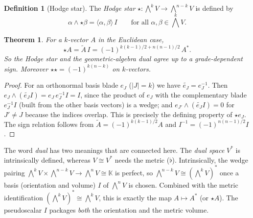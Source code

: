 \documentclass[11pt,a4paper]{article}
\newcounter{thm}[section]
\numberwithin{equation}{section}
\theoremstyle{definition}
\newtheorem{definition}[thm]{Definition}
\theoremstyle{plain}
\newtheorem{theorem}[thm]{Theorem}
\newcommand{\K}{\mathbb{K}}
\newcommand{\rev}[1]{\widetilde{#1}}
\newcommand{\pss}{I}
\newcommand{\dual}[1]{#1^{\ast}}
\newcommand{\hodge}{\star}
\begin{document}
\begin{definition}[Hodge star]
The \emph{Hodge star} $\hodge:\bigwedge^kV\to\bigwedge^{n-k}V$ is defined by
\[
 \alpha\wedge\hodge\beta=\langle\alpha,\beta\rangle\,\pss\qquad\text{for all }\alpha,\beta\in\textstyle\bigwedge^kV .
\]
\end{definition}

\begin{theorem}\label{thm:hodgeGA}
For a $k$-vector $A$ in the Euclidean case,
\[
 \hodge A=\rev A\,\pss=(-1)^{k(k-1)/2+n(n-1)/2}\,\dual A .
\]
So the Hodge star and the geometric-algebra dual agree up to a grade-dependent sign. Moreover $\hodge\hodge=(-1)^{k(n-k)}$ on $k$-vectors.
\end{theorem}
\begin{proof}
For an orthonormal basis blade $e_J$ ($|J|=k$) we have $\rev{e_J}=e_J^{-1}$. Then $e_J\wedge(\rev{e_J}\pss)=e_J\,e_J^{-1}\pss=\pss$, since the product of $e_J$ with the complementary blade $e_J^{-1}\pss$ (built from the other basis vectors) is a wedge; and $e_{J'}\wedge(\rev{e_J}\pss)=0$ for $J'\neq J$ because the indices overlap. This is precisely the defining property of $\hodge e_J$. The sign relation follows from $\rev A=(-1)^{k(k-1)/2}A$ and $\pss^{-1}=(-1)^{n(n-1)/2}\pss$.
\end{proof}

\begin{remark}
The word \emph{dual} has two meanings that are connected here. The \emph{dual space} $V^*$ is intrinsically defined, whereas $V\cong V^*$ needs the metric ($\flat$). Intrinsically, the wedge pairing $\bigwedge^kV\times\bigwedge^{n-k}V\to\bigwedge^nV\cong\K$ is perfect, so $\bigwedge^{n-k}V\cong(\bigwedge^kV)^*$ once a basis (orientation and volume) $\pss$ of $\bigwedge^nV$ is chosen. Combined with the metric identification $(\bigwedge^kV)^*\cong\bigwedge^kV$, this is exactly the map $A\mapsto\dual A$ (or $\hodge A$). The pseudoscalar $\pss$ packages \emph{both} the orientation and the metric volume.
\end{remark}
\end{document}
